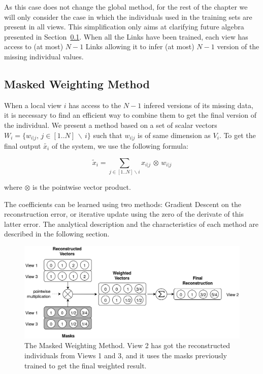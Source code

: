 As this case does not change the global method, for the rest of the chapter we will only consider the case in which the individuals used in the training sets are present in all views. This simplification only aims at clarifying future algebra presented in Section~\ref{sec:mwm}. When all the Links have been trained, each view has access to (at most) $N-1$ Links allowing it to infer (at most) $N-1$ version of the missing individual values.
		
		\subsection{Masked Weighting Method}
\label{sec:mwm}
When a local view $i$ has access to the $N-1$ infered versions of its missing data, it is necessary to find an efficient way to combine them to get the final version of the individual. We present a method based on a set of scalar vectors $W_i = \{w_{i|j}, \, j \in [1..N]\, \backslash \, i\}$ such that $w_{i|j}$ is of same dimension as $V_i$. To get the final output $\widetilde{x_i}$ of the system, we use the following formula:
		
    \begin{equation}
\label{eq:final}
        \widetilde{x}_i = \sum_{j \in [1..N] \backslash i} x_{i|j} \, \otimes \, w_{i|j}
    \end{equation}
	
where $\otimes$ is the pointwise vector product.
		
The coefficients can be learned using two methods: Gradient Descent on the reconstruction error, or iterative update using the zero of the derivate of this latter error. The analytical description and the characteristics of each method are described in the following section. 
		
	\begin{figure}[h]
		\centering
        \includegraphics[width=\textwidth]{img/mwm.png}
        \caption{The Masked Weighting Method. View 2 has got the reconstructed
        individuals from Views 1 and 3, and it uses the masks previously trained
        to get the final weighted result.}
\label{fig:mwm}
	\end{figure}
	
